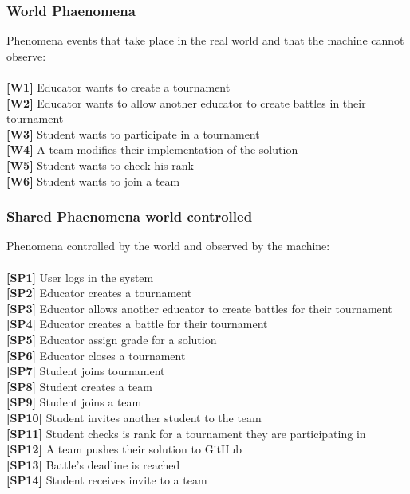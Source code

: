 \documentclass{article}
\begin{document}
\subsubsection{World Phaenomena}
Phenomena events that take place in the real world and that the machine cannot observe:\\\\
\textbf{[W1]} Educator wants to create a tournament\\
\textbf{[W2]} Educator wants to allow another educator to create battles in their tournament\\
\textbf{[W3]} Student wants to participate in a tournament\\
\textbf{[W4]} A team modifies their implementation of the solution\\
\textbf{[W5]} Student wants to check his rank\\
\textbf{[W6]} Student wants to join a team\\
\subsubsection{Shared Phaenomena world controlled}
Phenomena controlled by the world and observed by the machine:\\\\
\textbf{[SP1]} User logs in the system\\
\textbf{[SP2]} Educator creates a tournament\\
\textbf{[SP3]} Educator allows another educator to create battles for their tournament\\
\textbf{[SP4]} Educator creates a battle for their tournament\\
\textbf{[SP5]} Educator assign grade for a solution\\
\textbf{[SP6]} Educator closes a tournament\\
\textbf{[SP7]} Student joins tournament\\
\textbf{[SP8]} Student creates a team\\
\textbf{[SP9]} Student joins a team\\
\textbf{[SP10]} Student invites another student to the team\\
\textbf{[SP11]} Student checks is rank for a tournament they are participating in\\
\textbf{[SP12]} A team pushes their solution to GitHub\\
\textbf{[SP13]} Battle’s deadline is reached\\
\textbf{[SP14]} Student receives invite to a team\\
\end{document}
